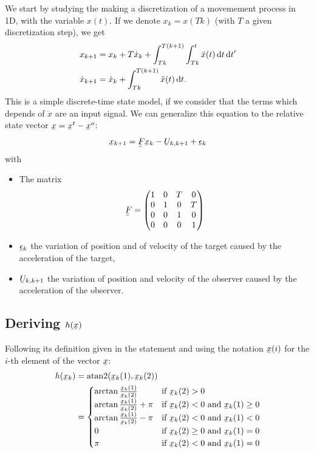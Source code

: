 \documentclass[english,DIV=13]{scrartcl}
\newcommand{\ubar}[1]{\underaccent{\bar}{#1}}
\newcommand{\uvec}[1]{\ubar{#1}}
\newcommand{\umatrix}[1]{\ubar{\ubar{#1}}}
\begin{document}
We start by studying the making a discretization of a movemement process in 1D, with the
variable $x(t)$. If we denote $x_k = x(Tk)$ (with $T$ a given discretization step), we
get
\begin{align*}
    x_{k+1} &= x_k + T\dot{x}_k + \int_{Tk}^{T(k+1)}\int_{Tk}^{t}\ddot{x}(t)\operatorname{d}\! t\operatorname{d}\! t' \\
    \dot{x}_{k+1} &=  \dot{x}_k + \int_{Tk}^{T(k+1)}\ddot{x}(t)\operatorname{d}\! t.
\end{align*}
This is a simple discrete-time state model, if we consider that the terms which depends of $\ddot{x}$
are an input signal.
We can generalize this equation to the relative state vector $\uvec{x} = \uvec{x}^t - \uvec{x}^o$:
\[\uvec{x}_{k+1} = \umatrix{F}\uvec{x}_k - \uvec{U}_{k,k+1} + \uvec{\epsilon}_k\]
with
\begin{itemize}
    \item The matrix
        \[\umatrix{F} =
        \begin{pmatrix}
            1 & 0 & T & 0 \\
            0 & 1 & 0 & T \\   
            0 & 0 & 1 & 0 \\
            0 & 0 & 0 & 1   
        \end{pmatrix}
        \]
    \item $\uvec{\epsilon}_k$ the variation of position and of velocity of the target caused by the
acceleration of the target,
    \item $\uvec{U}_{k,k+1}$ the variation of position and velocity of
the observer caused by the acceleration of the observer.
\end{itemize}

\subsection*{Deriving $h(\ubar{x})$}
Following its definition given in the statement and using the notation $\uvec{x}(i)$
for the $i$-th element of the vector $\uvec{x}$:
\begin{align*}
    h(\uvec{x}_k) &= \text{atan2}(\uvec{x}_k(1), \uvec{x}_k(2)) \\
    &= \begin{cases}
        \arctan\frac{\uvec{x}_k(1)}{\uvec{x}_k(2)} & \text{if $\uvec{x}_k(2) > 0$} \\
        \arctan\frac{\uvec{x}_k(1)}{\uvec{x}_k(2)}+\pi & \text{if $\uvec{x}_k(2) < 0$ and $\uvec{x}_k(1) \geq 0$} \\
        \arctan\frac{\uvec{x}_k(1)}{\uvec{x}_k(2)}-\pi & \text{if $\uvec{x}_k(2) < 0$ and $\uvec{x}_k(1) < 0$} \\
        0 & \text{if $\uvec{x}_k(2) \geq 0$ and $\uvec{x}_k(1) = 0$} \\
        \pi & \text{if $\uvec{x}_k(2) < 0$ and $\uvec{x}_k(1) = 0$}
    \end{cases}
\end{align*}
\end{document}
